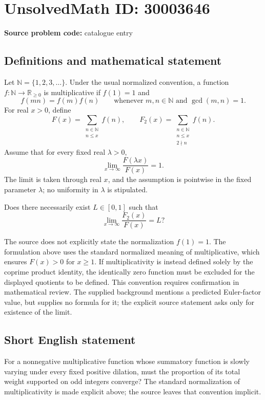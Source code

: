 \documentclass[11pt]{article}
\newcommand{\N}{\mathbb{N}}
\newcommand{\R}{\mathbb{R}}
\begin{document}
\section*{UnsolvedMath ID: 30003646}
\textbf{Source problem code:} catalogue entry
\subsection{Definitions and mathematical statement}
Let \(\N=\{1,2,3,\ldots\}\). Under the usual normalized convention, a function \(f:\N\to\R_{\geq0}\) is multiplicative if \(f(1)=1\) and
\[
f(mn)=f(m)f(n)\qquad\text{whenever }m,n\in\N\text{ and }\gcd(m,n)=1.
\]
For real \(x>0\), define
\[
F(x)=\sum_{\substack{n\in\N\\n\leq x}}f(n),\qquad
F_2(x)=\sum_{\substack{n\in\N\\n\leq x\\2\nmid n}}f(n).
\]
Assume that for every fixed real \(\lambda>0\),
\[
\lim_{x\to\infty}\frac{F(\lambda x)}{F(x)}=1.
\]
The limit is taken through real \(x\), and the assumption is pointwise in the fixed parameter \(\lambda\); no uniformity in \(\lambda\) is stipulated.

Does there necessarily exist \(L\in[0,1]\) such that
\[
\lim_{x\to\infty}\frac{F_2(x)}{F(x)}=L?
\]

The source does not explicitly state the normalization \(f(1)=1\). The formulation above uses the standard normalized meaning of multiplicative, which ensures \(F(x)>0\) for \(x\geq1\). If multiplicativity is instead defined solely by the coprime product identity, the identically zero function must be excluded for the displayed quotients to be defined. This convention requires confirmation in mathematical review. The supplied background mentions a predicted Euler-factor value, but supplies no formula for it; the explicit source statement asks only for existence of the limit.
\subsection{Short English statement}
For a nonnegative multiplicative function whose summatory function is slowly varying under every fixed positive dilation, must the proportion of its total weight supported on odd integers converge? The standard normalization of multiplicativity is made explicit above; the source leaves that convention implicit.
\end{document}
